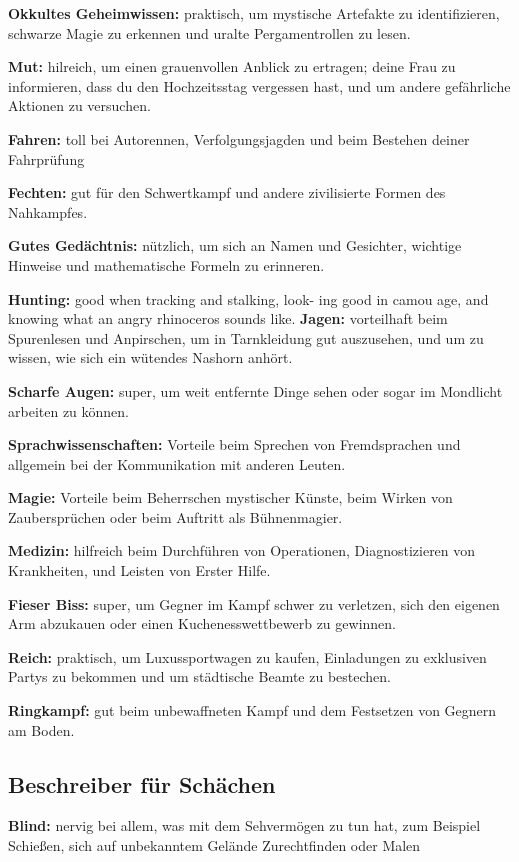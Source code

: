 \documentclass[]{article}
\begin{document}
\textbf{Okkultes Geheimwissen:} praktisch, um mystische Artefakte zu
identifizieren, schwarze Magie zu erkennen und uralte Pergamentrollen zu
lesen.

\textbf{Mut:} hilreich, um einen grauenvollen Anblick zu ertragen; deine
Frau zu informieren, dass du den Hochzeitsstag vergessen hast, und um
andere gefährliche Aktionen zu versuchen.

\textbf{Fahren:} toll bei Autorennen, Verfolgungsjagden und beim
Bestehen deiner Fahrprüfung

\textbf{Fechten:} gut für den Schwertkampf und andere zivilisierte
Formen des Nahkampfes.

\textbf{Gutes Gedächtnis:} nützlich, um sich an Namen und Gesichter,
wichtige Hinweise und mathematische Formeln zu erinneren.

\textbf{Hunting:} good when tracking and stalking, look- ing good in
camou age, and knowing what an angry rhinoceros sounds like.
\textbf{Jagen:} vorteilhaft beim Spurenlesen und Anpirschen, um in
Tarnkleidung gut auszusehen, und um zu wissen, wie sich ein wütendes
Nashorn anhört.

\textbf{Scharfe Augen:} super, um weit entfernte Dinge sehen oder sogar
im Mondlicht arbeiten zu können.

\textbf{Sprachwissenschaften:} Vorteile beim Sprechen von Fremdsprachen
und allgemein bei der Kommunikation mit anderen Leuten.

\textbf{Magie:} Vorteile beim Beherrschen mystischer Künste, beim Wirken
von Zaubersprüchen oder beim Auftritt als Bühnenmagier.

\textbf{Medizin:} hilfreich beim Durchführen von Operationen,
Diagnostizieren von Krankheiten, und Leisten von Erster Hilfe.

\textbf{Fieser Biss:} super, um Gegner im Kampf schwer zu verletzen,
sich den eigenen Arm abzukauen oder einen Kuchenesswettbewerb zu
gewinnen.

\textbf{Reich:} praktisch, um Luxussportwagen zu kaufen, Einladungen zu
exklusiven Partys zu bekommen und um städtische Beamte zu bestechen.

\textbf{Ringkampf:} gut beim unbewaffneten Kampf und dem Festsetzen von
Gegnern am Boden.

\subsection{Beschreiber für
Schächen}\label{beschreiber-fuxfcr-schuxe4chen}

\textbf{Blind:} nervig bei allem, was mit dem Sehvermögen zu tun hat,
zum Beispiel Schießen, sich auf unbekanntem Gelände Zurechtfinden oder
Malen
\end{document}
